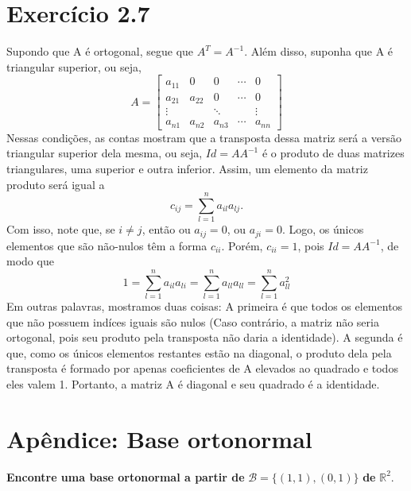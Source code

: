 \documentclass{article}
\begin{document}
\section*{Exerc\'icio 2.7}
Supondo que A \'e ortogonal, segue que $A ^{T} = A ^{-1}$. Al\'em disso, suponha que A \'e triangular superior, ou seja,
$$
	A = \begin{bmatrix}
		a _{11} & 0       & 0       & \cdots & 0       \\
		a_{21}  & a _{22} & 0       & \cdots & 0       \\
		\vdots  &         & \ddots  &        & \vdots  \\
		a _{n1} & a _{n2} & a _{n3} & \cdots & a _{nn}
	\end{bmatrix}
$$
Nessas condi\c c\~oes, as contas mostram que a transposta dessa matriz ser\'a a vers\~ao triangular superior dela mesma,
ou seja, $Id = AA^{-1}$ \'e o produto de duas matrizes triangulares, uma superior e outra inferior. Assim, um elemento
da matriz produto ser\'a igual a
$$
	c_{ij} = \sum_{l=1}^{n} a _{il}a _{lj}.
$$
Com isso, note que, se $i\neq{j}$, ent\~ao ou $a_{ij} = 0$, ou $a _{ji} = 0$. Logo, os \'unicos elementos que
s\~ao n\~ao-nulos t\^em a forma $c _{ii}$. Por\'em, $c_{ii} = 1$, pois $Id = AA ^{-1}$, de modo que
$$
	1 = \sum_{l=1}^{n} a_{il}a_{li} = \sum_{l=1}^{n} a _{ll}a _{ll} = \sum _{l=1}^{n} a _{ll}^{2}
$$
Em outras palavras, mostramos duas coisas: A primeira \'e que todos os elementos que n\~ao possuem ind\'ices iguais
s\~ao nulos (Caso contr\'ario, a matriz n\~ao seria ortogonal, pois seu produto pela transposta n\~ao daria a identidade).
A segunda \'e que, como os \'unicos elementos restantes est\~ao na diagonal, o produto dela pela transposta \'e formado
por apenas coeficientes de A elevados ao quadrado e todos eles valem 1. Portanto, a matriz A \'e diagonal e seu
quadrado \'e a identidade.

\section*{Ap\^endice: Base ortonormal}
\textbf{Encontre uma base ortonormal a partir de } $\mathcal{B} = \{(1, 1), (0, 1)\}$ \textbf{de} $\mathbb{R} ^{2}$.
\end{document}
